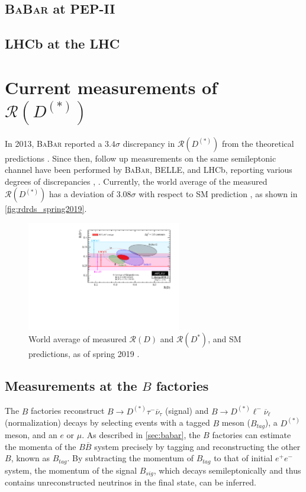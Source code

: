 \documentclass[12pt,letterpaper]{article}
\def\BaBar/{\textsc{BaBar}}
\def\RD/{\ensuremath{\mathcal{R}(D)}}
\def\RDst/{\ensuremath{\mathcal{R}(D^{*})}}
\def\RDDst/{\ensuremath{\mathcal{R}(D^{(*)})}}
\begin{document}
\subsection{\BaBar/ at PEP-II} \label{sec:babar}


\subsection{LHCb at the LHC} \label{sec:lhcb}


\section{Current measurements of \RDDst/}
In 2013, \BaBar/ reported a $3.4\sigma$ discrepancy in \RDDst/ from the
theoretical predictions \cite{Lees:2013rw}.
Since then, follow up measurements on the same semileptonic channel have been
performed by \BaBar/, BELLE, and LHCb, reporting various degrees of
discrepancies \cite{Hirose:2017185}, \cite{LHCb:PhysRevLett.115.111803}.
Currently, the world average of the measured \RDDst/ has a deviation of
$3.08\sigma$ with respect to SM prediction \cite{HFLAV:2019}, as shown
in \autoref{fig:rdrds_spring2019}.

\begin{figure}[ht]
    \centering
    \includegraphics[width=0.6\textwidth]{figs/rdrds_spring2019.pdf}
    \caption{
        World average of measured \RD/ and \RDst/, and SM predictions, as of
        spring 2019 \cite{HFLAV:2019}.
    }
    \label{fig:rdrds_spring2019}
\end{figure}

\subsection{Measurements at the $B$ factories} \label{sec:meas_bfactories}
The $B$ factories reconstruct $B \rightarrow D^{(*)} \tau^- \overline{\nu}_\tau$ (signal) and $B \rightarrow D^{(*)} \ell^- \overline{\nu}_\ell$ (normalization) decays by selecting events with a tagged $B$ meson ($B_{tag}$), a $D^{(*)}$ meson, and an $e$ or $\mu$.
As described in \autoref{sec:babar}, the $B$ factories
can estimate the momenta of the $B \overline{B}$ system precisely by tagging and reconstructing the other $B$, known as $B_{tag}$. By subtracting the momentum
of $B_{tag}$ to that of initial $e^+e^-$ system, the momentum of
the signal $B_{sig}$, which decays semileptonically and thus contains unreconstructed
neutrinos in the final state, can be inferred.
\end{document}
